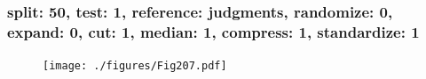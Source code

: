 \begin{frame}\frametitle{\small split: 50, test: 1, reference: judgments, randomize: 0, expand: 0, cut: 1, median: 1, compress: 1, standardize: 1} 
\begin{center} 
\begin{figure} 
\centering 
\texttt{[image: ./figures/Fig207.pdf]} 
\label{sp50Te1RejuRa0Ex0Cu1Me1Co1St1} 
\end{figure} 
\end{center} 
  
  
\end{frame}  
